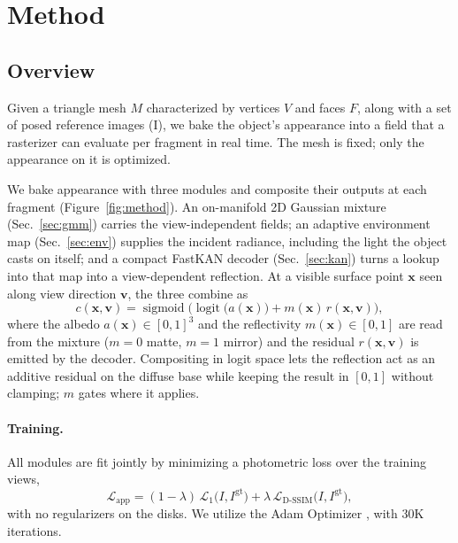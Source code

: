 
\vspace{-1mm}
\section{Method}
\vspace{-1mm}
\subsection{Overview}
\label{sec:overview}

Given a triangle mesh $M$ characterized by vertices $V$ and faces $F$, along with a set of posed reference images (I), we bake the object's appearance into a field that a rasterizer can evaluate per fragment in real time. 
The mesh is fixed; only the appearance on it is optimized.

We bake appearance with three modules and composite their outputs at each fragment (Figure~\ref{fig:method}).
An on-manifold 2D Gaussian mixture (Sec.~\ref{sec:gmm}) carries the view-independent fields; an
adaptive environment map (Sec.~\ref{sec:env}) supplies the incident radiance, including the light
the object casts on itself; and a compact FastKAN decoder (Sec.~\ref{sec:kan}) turns a lookup into
that map into a view-dependent reflection. At a visible surface point $\mathbf{x}$ seen along view
direction $\mathbf{v}$, the three combine as
%
\begin{equation}
c(\mathbf{x}, \mathbf{v}) = \operatorname{sigmoid}\!\Big( \operatorname{logit}\big(a(\mathbf{x})\big)
+ m(\mathbf{x})\, r(\mathbf{x}, \mathbf{v}) \Big),
\label{eq:appearance}
\end{equation}
%
where the albedo $a(\mathbf{x})\in[0,1]^3$ and the reflectivity $m(\mathbf{x})\in[0,1]$ are read
from the mixture ($m{=}0$ matte, $m{=}1$ mirror) and the residual $r(\mathbf{x},\mathbf{v})$ is
emitted by the decoder. Compositing in logit space lets the reflection act as an additive residual
on the diffuse base while keeping the result in $[0,1]$ without clamping; $m$ gates where it
applies. 

\paragraph{Training.} All modules are fit jointly by minimizing a photometric loss over the
training views,
%
\begin{equation}
\mathcal{L}_{\text{app}} = (1-\lambda)\,\mathcal{L}_1\big(I, I^{\text{gt}}\big)
+ \lambda\,\mathcal{L}_{\text{D-SSIM}}\big(I, I^{\text{gt}}\big),
\label{eq:loss}
\end{equation}
%
with no regularizers on the disks. We utilize the Adam Optimizer \citep{adam}, with 30K iterations.


